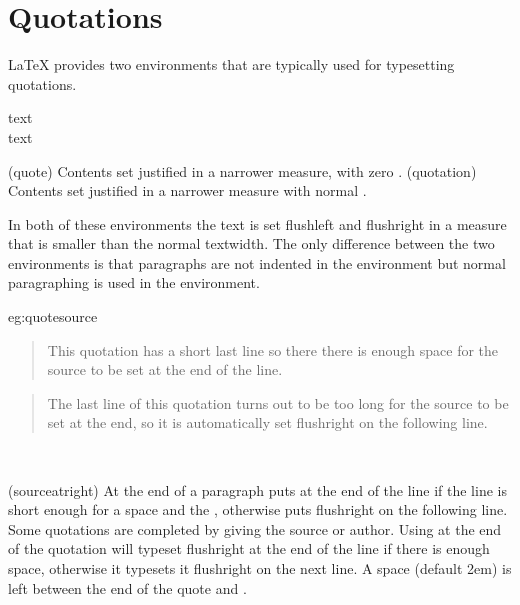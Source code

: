 \section{Quotations}

    LaTeX provides two environments that are typically used for typesetting
quotations.

\begin{syntax}
 text  \\
 text  \\
\end{syntax}
\glossary(quote)%
  {}%
  {Contents set justified in a narrower measure, with zero .}
\glossary(quotation)%
  {}%
  {Contents set justified in a narrower measure with normal .}

     In both of these environments the text is set flushleft and flushright
in a measure that is smaller than the normal textwidth. The only difference
between the two environments is that paragraphs 
are not indented in the 
environment but normal paragraphing is used in the  environment.


\begin{egresult}{eg:quotesource}
\begin{quotation}
\hspace*{-0.5\parindent}This quotation has a short last line so there there is enough space 
for the source to be set at
the end of the line.
\end{quotation}

\begin{quotation}
The last line of this quotation turns out to be too long for
the source to be set at the end, so it is automatically
set flushright on the following line.
\end{quotation}
\end{egresult}

\begin{syntax}
\cmd{\sourceatright} \\
\end{syntax}
\glossary(sourceatright)%
  {}%
  {At the end of a paragraph puts  at the end of the line
   if the line is short enough for a space  and the ,
   otherwise puts  flushright on the following line.}
Some quotations are completed by giving the source or author. Using
\cmd{\sourceatright} at the end of the quotation will typeset 
flushright at the end of the line if there is enough space, otherwise it 
typesets it flushright on the next line. A space  (default 2em)
is left between the end of the quote and .

